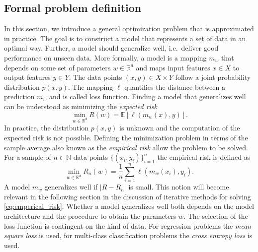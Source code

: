 \documentclass[12pt]{article}
\theoremstyle{definition}
\numberwithin{equation}{section}
\newcommand{\ev}[1]{\mathbb{E}\left[{#1}\right]}
\begin{document}
\subsection{Formal problem definition}
In this section, we introduce a general optimization problem that is approximated in practice. The goal is to construct a model that represents a set of data in an optimal way. Further, a model should generalize well, i.e.\ deliver good performance on unseen data. More formally, a model is a mapping $m_w$ that depends on some set of parameters $w \in \mathbb{R}^d$ and maps input features $x \in X$ to output features $y \in Y$. The data points $(x,y) \in X \times Y$ follow a joint probability distribution $p(x,y)$. The mapping $\ell$ quantifies the distance between a prediction $m_{w}$ and is called loss function. Finding a model that generalizes well can be understood as minimizing the \emph{expected risk}
\begin{equation}
  \min_{w \in \mathbb{R}^d} R(w) = \ev{\ell(m_{w}(x),y)}.
\end{equation}
In practice, the distribution $p(x,y)$ is unknown and the computation of the expected risk is not possible. Defining the minimization problem in terms of the sample average also known as the \emph{empirical risk} allow the problem to be solved. For a sample of $n \in \mathbb{N}$ data points $\{(x_i, y_i)\}_{i=1}^n$ the empirical risk is defined as 
\begin{equation}
  \label{eq:emperical_risk}
  \min_{w \in \mathbb{R}^d}  R_n(w) = \frac{1}{n}\sum_{i=1}^n\ell(m_{w}(x_i),y_i).
\end{equation}
A model $m_{w}$ generalizes well if $|R - R_n|$ is small. This notion will become relevant in the following section in the discussion of iterative methods for solving \eqref{eq:emperical_risk}. Whether a model generalizes well both depends on the model architecture and the procedure to obtain the parameters $w$. 
The selection of the loss function is contingent on the kind of data. For regression problems the \emph{mean square loss} is used, for multi-class classification problems the \emph{cross entropy loss} is used.
\end{document}
